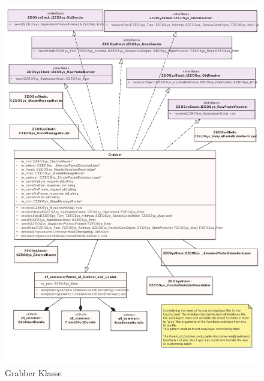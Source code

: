 \documentclass[12pt,a4paper]{scrreprt}
\begin{document}
\begin{figure}[htbp] 
  \centering
     \includegraphics[width=1.0\textwidth]{generate.pdf}
  \caption{Grabber Klasse}
  \label{fig:Bild1}
\end{figure}
\end{document}
